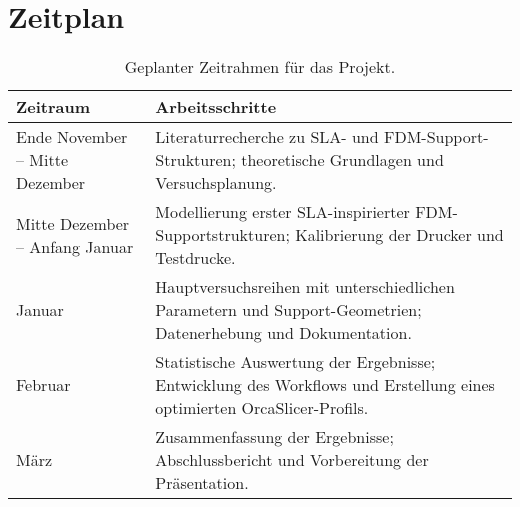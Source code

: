 \chapter{Zeitplan}
\label{cha:Zeitplan}

\begin{table}[h!]
\centering
\begin{tabular}{p{4cm} p{9cm}}
\textbf{Zeitraum} & \textbf{Arbeitsschritte} \\
\hline
Ende November – Mitte Dezember & Literaturrecherche zu SLA- und FDM-Support-Strukturen; theoretische Grundlagen und Versuchsplanung. \\[4pt]
Mitte Dezember – Anfang Januar & Modellierung erster SLA-inspirierter FDM-Supportstrukturen; Kalibrierung der Drucker und Testdrucke. \\[4pt]
Januar & Hauptversuchsreihen mit unterschiedlichen Parametern und Support-Geometrien; Datenerhebung und Dokumentation. \\[4pt]
Februar & Statistische Auswertung der Ergebnisse; Entwicklung des Workflows und Erstellung eines optimierten OrcaSlicer-Profils. \\[4pt]
März & Zusammenfassung der Ergebnisse; Abschlussbericht und Vorbereitung der Präsentation. \\
\hline
\end{tabular}
\caption{Geplanter Zeitrahmen für das Projekt.}
\end{table}
